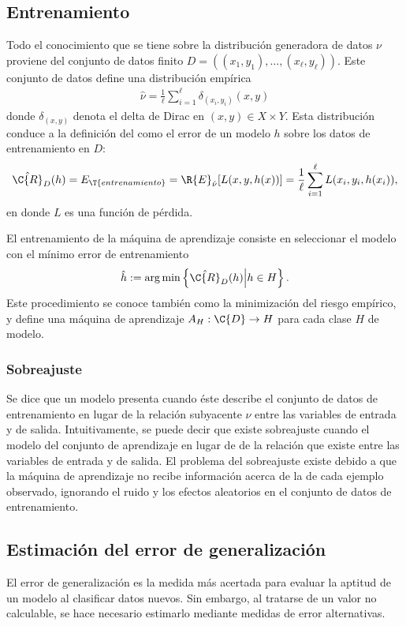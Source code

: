 \subsection{Entrenamiento}
%
Todo el conocimiento que se tiene sobre la distribución generadora de
datos $\nu$ proviene del conjunto de datos finito
$D=\left((x_1,y_1),\ldots,(x_\ell,y_\ell)\right)$.  Este conjunto de
datos define una distribución empírica
%
\begin{align}
  \hat{\nu}=\frac{1}{\ell}\sum_{i=1}^{\ell}\delta_{(x_i,y_i)}(x,y)
\end{align}
%
donde $\delta_{(x,y)}$ denota el delta de Dirac en
$(x,y)\in{}X\times{}Y$.  Esta distribución conduce a la definición del
 como el error de un modelo $h$ sobre los
datos de entrenamiento en $D$:
%
\begin{align}
  \hat{\C{R}}_D(h)=E_\T{entrenamiento}=\R{E}_{\hat{\nu}}[L(x,y,h(x))]
  =\frac{1}{\ell}\sum_{i=1}^\ell L(x_i, y_i, h(x_i)),
\end{align}
%
en donde $L$ es una función de pérdida.

El entrenamiento de la máquina de aprendizaje consiste en
seleccionar el modelo con el mínimo error de entrenamiento
%
\begin{align}
  \hat{h}:=\arg \min \left\{ \hat{\C{R}}_D(h)\middle|h \in H\right\}.
\end{align}
%
Este procedimiento se conoce también como la minimización del riesgo
empírico, y define una máquina de aprendizaje
$A_H:\C{D}\rightarrow{}H$ para cada clase $H$ de modelo.
%
\subsubsection{Sobreajuste}
%
Se dice que un modelo presenta  cuando éste describe
el conjunto de datos de entrenamiento en lugar de la relación
subyacente $\nu$ entre las variables de entrada y de salida.
Intuitivamente, se puede decir que existe sobreajuste cuando el modelo
 del conjunto de aprendizaje en lugar de
 de la relación que existe entre las variables
de entrada y de salida. El problema del
sobreajuste existe debido a que la máquina de aprendizaje no recibe
información acerca de la  de cada ejemplo observado,
ignorando el ruido y los efectos aleatorios en el conjunto de datos de
entrenamiento.
%
%
\subsection{Estimación del error de generalización}
%
El error de generalización es la medida más acertada para evaluar la
aptitud de un modelo al clasificar datos nuevos.  Sin embargo, al
tratarse de un valor no calculable, se hace necesario estimarlo
mediante medidas de error alternativas.
%
